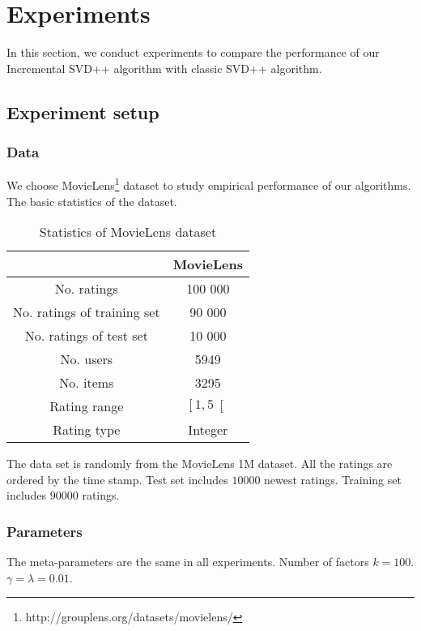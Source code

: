 \documentclass[oneside,13pt]{extreport}
\begin{document}
\chapter{Experiments}
\label{experiments}

In this section, we conduct experiments to compare the performance
of our Incremental SVD++ algorithm with classic SVD++ algorithm.

\section{Experiment setup}
\subsection{Data}
We choose MovieLens\footnote{http://grouplens.org/datasets/movielens/} dataset to study empirical
performance of our algorithms. The basic statistics of the dataset.

\begin{table}[h!]
    \small\centering
    \begin{tabular}{|c|c|}
        \hline
         & MovieLens  \\
        \hline
        No. ratings & 100 000 \\
        \hline
         No. ratings of training set & 90 000 \\
        \hline
         No. ratings of test set & 10 000 \\
        \hline
        No. users &  5949  \\
        \hline
        No. items &  3295 \\
        \hline
        Rating range & $\left[1, 5\right[$ \\
        \hline
        Rating type &  Integer\\
        \hline
    \end{tabular}
    \label{tab:MovieLens_datatest}
    \caption{ Statistics of MovieLens dataset}
\end{table}

The data set is  randomly from the MovieLens 1M dataset. All the ratings are ordered by the time stamp. Test set includes $10000$ newest ratings. Training set includes $90000$ ratings.
\subsection{Parameters} 
The meta-parameters are the same in all experiments. 
Number of factors $k = 100$. $\gamma = \lambda = 0.01$.
\end{document}
